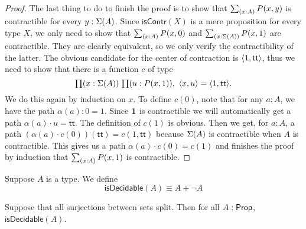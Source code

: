 \begin{proof}
The last thing to do to finish the proof is to show that 
$\sm{x:A} P(x,y)$ is contractible for every $y:\Sigma(A)$. 
Since $\mathsf{isContr}(X)$ is a mere proposition for every type $X$, 
we only need to show that $\sm{x:A} P(x,0)$ and 
$\sm{x:\susp(A)} P(x,1)$ are contractible. 
They are clearly equivalent, so we only verify the contractibility 
of the latter. The obvious candidate for the center of contraction 
is ${\langle 1,\mathsf{tt}\rangle}$, thus we need to show that there is a 
function $c$ of type
\begin{equation*}
\prd{x:\susp(A)}{u:P(x,1)} \langle{x,u}\rangle=\langle{1,\mathsf{tt}}\rangle.
\end{equation*}
We do this again by induction on $x$. To define $c(0)$, note that 
for any $a:A$, we have the path $\alpha(a):0= 1$. Since 
$\mathbf{1}$ is contractible we will automatically get a path 
$\alpha(a)\cdot u=\mathsf{tt}$. The definition of $c(1)$ is obvious. 
Then we get, for $a:A$, a path 
$(\alpha(a)\cdot c(0))(\mathsf{tt})= c(1,\mathsf{tt})$ 
because $\Sigma(A)$ is contractible when $A$ is contractible. 
This gives us a path $\alpha(a)\cdot c(0)= c(1)$ and finishes 
the proof by induction that $\sm{x:A} P(x,1)$ is contractible.
\end{proof}

\begin{defn}
Suppose $A$ is a type. We define
\begin{equation*}
\mathsf{isDecidable}(A)\equiv  A+\neg A
\end{equation*}
\end{defn}

\begin{thm}\label{thm:1surj_to_surj_to_pem}
Suppose that all surjections between sets split. Then for all $A:\mathsf{Prop}$,
$\mathsf{isDecidable}(A)$. 
\end{thm}

